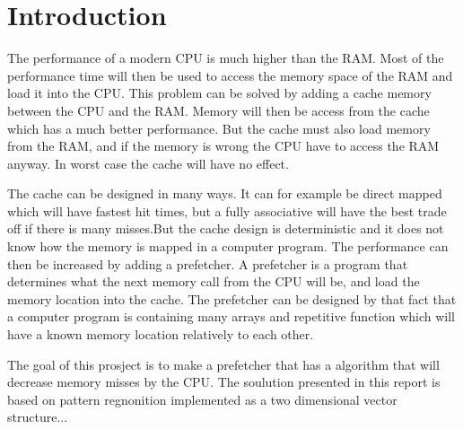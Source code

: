 \section*{Introduction}
The performance of a modern CPU is much higher than the RAM. Most of the performance time will then be used to access the memory space of the RAM and load it into the CPU. This problem can be solved by adding a cache memory between the CPU and the RAM. Memory will then be access from the cache which has a much better performance. But the cache must also load memory from the RAM, and if the memory is wrong the CPU have to access the RAM anyway. In worst case the cache will have no effect.

The cache can be designed in many ways. It can for example be direct mapped which will have fastest hit times, but a fully associative will have the best trade off if there is many misses.But the cache design is deterministic and it does not know how the memory is mapped in a computer program. The performance can then be increased by adding a prefetcher. A prefetcher is a program that determines what the next memory call from the CPU will be, and load the memory location into the cache. The prefetcher can be designed by that fact that a computer program is containing many arrays and repetitive function which will have a known memory location relatively to each other.

The goal of this prosject is to make a prefetcher that has a algorithm that will decrease memory misses by the CPU. The soulution presented in this report is based on pattern regnonition implemented as a two dimensional vector structure...
